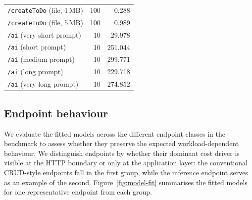 \documentclass[sigconf]{acmart}
\begin{document}
\begin{table}[h]
\begin{tabular}{p{4.3cm}rr}
\texttt{/createToDo} (file, 1\,MB)           & 100 & 0.288 \\
\texttt{/createToDo} (file, 5\,MB)           & 100 & 0.989 \\
\midrule
\texttt{/ai} (very short prompt)             &  10 & 29.978 \\
\texttt{/ai} (short prompt)                  &  10 & 251.044 \\
\texttt{/ai} (medium prompt)                 &  10 & 299.771 \\
\texttt{/ai} (long prompt)                   &  10 & 229.718 \\
\texttt{/ai} (very long prompt)              &  10 & 274.852 \\
\bottomrule
\end{tabular}
\end{table}

\subsection{Endpoint behaviour}
We evaluate the fitted models across the different endpoint classes in the benchmark to assess whether they preserve the expected workload-dependent behaviour. We distinguish endpoints by whether their dominant cost driver is visible at the HTTP boundary or only at the application layer: the conventional CRUD-style endpoints fall in the first group, while the inference endpoint serves as an example of the second. Figure~\ref{fig:model-fit} summarises the fitted models for one representative endpoint from each group.
\end{document}

